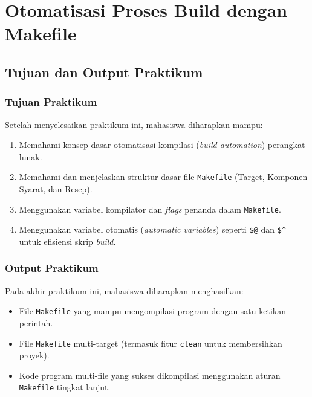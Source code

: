 
\chapter{Otomatisasi Proses Build dengan Makefile}
\label{chap:modul-06}

\section{Tujuan dan Output Praktikum}

\subsection{Tujuan Praktikum}
Setelah menyelesaikan praktikum ini, mahasiswa diharapkan mampu:
\begin{enumerate}
	\item Memahami konsep dasar otomatisasi kompilasi (\textit{build automation}) perangkat lunak.
	\item Memahami dan menjelaskan struktur dasar file \texttt{Makefile} (Target, Komponen Syarat, dan Resep).
	\item Menggunakan variabel kompilator dan \textit{flags} penanda dalam \texttt{Makefile}.
	\item Menggunakan variabel otomatis (\textit{automatic variables}) seperti \texttt{\$@} dan \texttt{\$\textasciicircum} untuk efisiensi skrip \textit{build}.
\end{enumerate}

\subsection{Output Praktikum}
Pada akhir praktikum ini, mahasiswa diharapkan menghasilkan:
\begin{itemize}
	\item File \texttt{Makefile} yang mampu mengompilasi program dengan satu ketikan perintah.
	\item File \texttt{Makefile} multi-target (termasuk fitur \texttt{clean} untuk membersihkan proyek).
	\item Kode program multi-file yang sukses dikompilasi menggunakan aturan \texttt{Makefile} tingkat lanjut.
\end{itemize}


